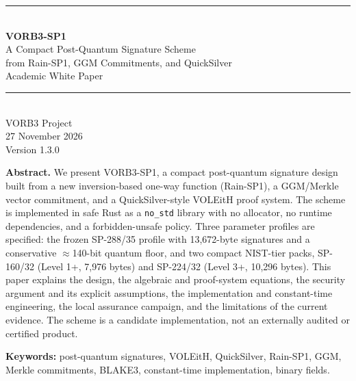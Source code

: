 \documentclass[11pt,a4paper]{article}
\begin{document}
\begin{titlepage}
\centering
\vspace*{2.2cm}
{\color{vorb3blue}\rule{\linewidth}{1.2pt}}\\[0.8cm]
{\Huge\bfseries VORB3-SP1}\\[0.35cm]
{\LARGE A Compact Post-Quantum Signature Scheme\\[0.15cm]
from Rain-SP1, GGM Commitments, and QuickSilver}\\[0.8cm]
{\Large Academic White Paper}\\[0.5cm]
{\color{vorb3blue}\rule{\linewidth}{1.2pt}}\\[1.2cm]

{\large VORB3 Project}\\[0.3cm]
{\large 27 November 2026}\\[0.3cm]
{\large Version 1.3.0}\\[1.0cm]


\vfill
\begin{minipage}{0.9\linewidth}
\small
\textbf{Abstract.}
We present VORB3-SP1, a compact post-quantum signature design built from a
new inversion-based one-way function (Rain-SP1), a GGM/Merkle vector
commitment, and a QuickSilver-style VOLEitH proof system. The scheme is
implemented in safe Rust as a \texttt{no\_std} library with no allocator, no
runtime dependencies, and a forbidden-unsafe policy. Three parameter profiles
are specified: the frozen SP-288/35 profile with 13,672-byte signatures and a
conservative $\approx$140-bit quantum floor, and two compact NIST-tier packs,
SP-160/32 (Level 1+, 7,976 bytes) and SP-224/32 (Level 3+, 10,296 bytes).
This paper explains the design, the algebraic and proof-system equations, the
security argument and its explicit assumptions, the implementation and
constant-time engineering, the local assurance campaign, and the limitations
of the current evidence. The scheme is a candidate implementation, not an
externally audited or certified product.
\end{minipage}

\vspace{0.7cm}
{\small\textbf{Keywords:} post-quantum signatures, VOLEitH, QuickSilver,
Rain-SP1, GGM, Merkle commitments, BLAKE3, constant-time implementation,
binary fields.}
\end{titlepage}

\end{document}
